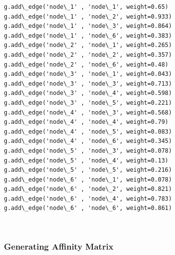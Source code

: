 \documentclass[11pt]{article}
\begin{document}
    \begin{Verbatim}[commandchars=\\\{\}]
g.add\_edge('node\_1' , 'node\_1', weight=0.65)
g.add\_edge('node\_1' , 'node\_2', weight=0.933)
g.add\_edge('node\_1' , 'node\_3', weight=0.864)
g.add\_edge('node\_1' , 'node\_6', weight=0.383)
g.add\_edge('node\_2' , 'node\_1', weight=0.265)
g.add\_edge('node\_2' , 'node\_2', weight=0.357)
g.add\_edge('node\_2' , 'node\_6', weight=0.48)
g.add\_edge('node\_3' , 'node\_1', weight=0.043)
g.add\_edge('node\_3' , 'node\_3', weight=0.713)
g.add\_edge('node\_3' , 'node\_4', weight=0.598)
g.add\_edge('node\_3' , 'node\_5', weight=0.221)
g.add\_edge('node\_4' , 'node\_3', weight=0.568)
g.add\_edge('node\_4' , 'node\_4', weight=0.79)
g.add\_edge('node\_4' , 'node\_5', weight=0.083)
g.add\_edge('node\_4' , 'node\_6', weight=0.345)
g.add\_edge('node\_5' , 'node\_3', weight=0.078)
g.add\_edge('node\_5' , 'node\_4', weight=0.13)
g.add\_edge('node\_5' , 'node\_5', weight=0.216)
g.add\_edge('node\_6' , 'node\_1', weight=0.078)
g.add\_edge('node\_6' , 'node\_2', weight=0.821)
g.add\_edge('node\_6' , 'node\_4', weight=0.783)
g.add\_edge('node\_6' , 'node\_6', weight=0.861)

    \end{Verbatim}

    \begin{center}
    \end{center}
    { \hspace*{\fill} \\}
    
    \subsubsection{Generating Affinity
Matrix}\label{generating-affinity-matrix}
\end{document}
